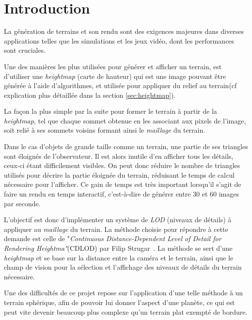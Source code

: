   \chapter*{Introduction}
  \setcounter{chapter}{0}
  
  La génération de terrains et son rendu sont des exigences majeures dans diverses applications telles que les simulations et les jeux vidéo, dont les performances sont cruciales.
  
  Une des manières les plus utilisées pour générer et afficher un terrain, est d'utiliser une \emph{heightmap} (carte de hauteur) qui est une image pouvant être générée à l'aide d'algorithmes, et utilisée pour appliquer du relief au terrain(cf explication plus détaillée dans la section \ref{sec:heightmap}).
  
  La façon la plus simple par la suite pour former le terrain à partir de la \emph{heightmap}, tel que chaque sommet obtenue en les associant aux pixels de l'image, soit relié à ses sommets voisins formant ainsi le \emph{maillage} du terrain.
  
  Dans le cas d'objets de grande taille comme un terrain, une partie de
  ses triangles sont éloignés de l'observateur. Il est alors inutile d'en
  afficher tous les détails, ceux-ci étant difficilement visibles. On peut
  donc réduire le nombre de triangles utilisés pour décrire la partie
  éloignée du terrain, réduisant le temps de calcul nécessaire pour
  l'afficher. Ce gain de temps est très important lorsqu'il s'agit de
  faire un rendu en temps interactif, c'est-à-dire de générer entre 30 et
  60 images par seconde.
  
  L'objectif est donc d'implémenter un système de \emph{LOD} (niveaux de détails) à appliquer au \emph{maillage} du terrain. La méthode choisie pour répondre à cette demande est celle de "\emph{Continuous Distance-Dependent Level of Detail for Rendering Heightma"}(CDLOD) par Filip Strugar~\cite{CDLOD}. La méthode se sert d'une \emph{heightmap} et se base sur la distance entre la caméra et le terrain, ainsi que le champ de vision pour la sélection et l'affichage des niveaux de détails du terrain nécessaire.
  
  Une des difficultés de ce projet repose sur l'application d'une telle méthode à un terrain sphérique, afin de pouvoir lui donner l'aspect d'une planète, ce qui est peut vite devenir beaucoup plus complexe qu'un terrain plat exempté de bordure.
  